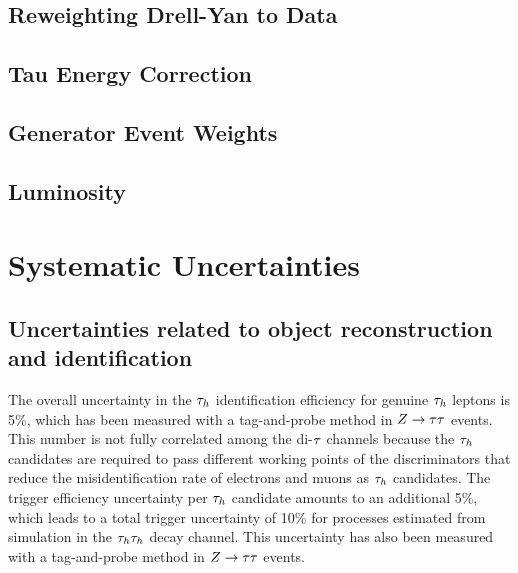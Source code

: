 \subsection{Reweighting Drell-Yan to Data}
\subsection{Tau Energy Correction}
\subsection{Generator Event Weights}
\subsection{Luminosity}

\pagebreak

\section{Systematic Uncertainties}

\subsection{Uncertainties related to object reconstruction and identification}

The overall uncertainty in the $\tau_{h}$ identification efficiency for genuine $\tau_{h}$ leptons is 5\%, which has been measured with a tag-and-probe method in $Z\to\tau\tau$ events.
This number is not fully correlated among the di-$\tau$ channels because the $\tau_{h}$ candidates are required to pass
different working points of the discriminators that reduce the misidentification rate of electrons and muons as $\tau_{h}$ candidates.
The trigger efficiency uncertainty per $\tau_{h}$ candidate amounts to an additional 5\%, which leads to a total trigger uncertainty of 10\% for processes estimated from simulation in the $\tau_{h}\tau_{h}$ decay channel. This uncertainty has also been measured with a tag-and-probe method in $Z\to\tau\tau$ events.


